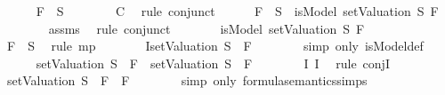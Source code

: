 \begin{isabellebody}
\ \ \ \ \isamarkupfalse%
\ {\isachardoublequoteopen}F{}\ {\isasymin}\ S{\isachardoublequoteclose}\isanewline
\ \ \ \ \ \ \isamarkupfalse%
\ C\ \isamarkupfalse%
\ {\isacharparenleft}rule\ conjunct{}{\isacharparenright}\isanewline
\ \ \ \ \isamarkupfalse%
\ {\isachardoublequoteopen}F{}\ {\isasymin}\ S\ {\isasymlongrightarrow}\ isModel\ {\isacharparenleft}setValuation\ S{\isacharparenright}\ F{}{\isachardoublequoteclose}\isanewline
\ \ \ \ \ \ \isamarkupfalse%
\ assms{\isacharparenleft}{}{\isacharparenright}\ \isamarkupfalse%
\ {\isacharparenleft}rule\ conjunct{}{\isacharparenright}\isanewline
\ \ \ \ \isamarkupfalse%
\ \isamarkupfalse%
\ {\isachardoublequoteopen}isModel\ {\isacharparenleft}setValuation\ S{\isacharparenright}\ F{}{\isachardoublequoteclose}\isanewline
\ \ \ \ \ \ \isamarkupfalse%
\ {\isacartoucheopen}F{}\ {\isasymin}\ S{\isacartoucheclose}\ \isamarkupfalse%
\ {\isacharparenleft}rule\ mp{\isacharparenright}\isanewline
\ \ \ \ \isamarkupfalse%
\ \isamarkupfalse%
\ I{}{\isacharcolon}{\isachardoublequoteopen}{\isacharparenleft}setValuation\ S{\isacharparenright}\ {\isasymTurnstile}\ F{}{\isachardoublequoteclose}\isanewline
\ \ \ \ \ \ \isamarkupfalse%
\ {\isacharparenleft}simp\ only{\isacharcolon}\ isModel{\isacharunderscore}def{\isacharparenright}\ \isanewline
\ \ \ \ \isamarkupfalse%
\ {\isachardoublequoteopen}{\isacharparenleft}{\isacharparenleft}setValuation\ S{\isacharparenright}\ {\isasymTurnstile}\ F{}{\isacharparenright}\ {\isasymand}\ {\isacharparenleft}{\isacharparenleft}setValuation\ S{\isacharparenright}\ {\isasymTurnstile}\ F{}{\isacharparenright}{\isachardoublequoteclose}\isanewline
\ \ \ \ \ \ \isamarkupfalse%
\ I{}\ I{}\ \isamarkupfalse%
\ {\isacharparenleft}rule\ conjI{\isacharparenright}\isanewline
\ \ \ \ \isamarkupfalse%
\ \isamarkupfalse%
\ {\isachardoublequoteopen}{\isacharparenleft}setValuation\ S{\isacharparenright}\ {\isasymTurnstile}\ {\isacharparenleft}F{}\ \isactrlbold {\isasymand}\ F{}{\isacharparenright}{\isachardoublequoteclose}\isanewline
\ \ \ \ \ \ \isamarkupfalse%
\ {\isacharparenleft}simp\ only{\isacharcolon}\ formula{\isacharunderscore}semantics{\isachardot}simps{\isacharparenleft}{}{\isacharparenright}{\isacharparenright}\isanewline

\end{isabellebody}

